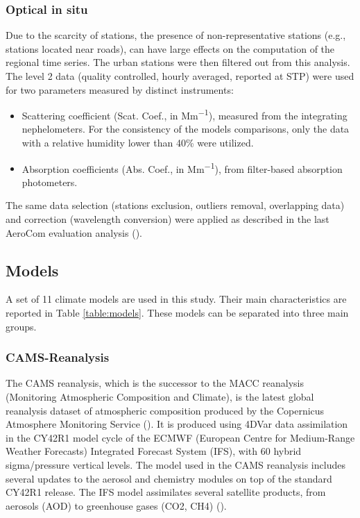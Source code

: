 \documentclass[journal abbreviation, manuscript]{copernicus}
\begin{document}
\subsubsection{Optical in situ}
Due to the scarcity of stations, the presence of non-representative stations (e.g., stations located near roads), can have large effects on the computation of the regional time series. The urban stations were then filtered out from this analysis. The level 2 data (quality controlled, hourly averaged, reported at STP) were used for two parameters measured by distinct instruments:

\begin{itemize}
 \item Scattering coefficient (Scat. Coef., in \unit{Mm^{-1}}), measured from the integrating nephelometers. For the consistency of the models comparisons, only the data with a relative humidity lower than 40\% were utilized.
 \item Absorption coefficients (Abs. Coef., in \unit{Mm^{-1}}), from filter-based absorption photometers.
\end{itemize}

The same data selection (stations exclusion, outliers removal, overlapping data) and correction (wavelength conversion) were applied as described in the last AeroCom evaluation analysis (\cite{jonaseval}).

\subsection{Models}
A set of 11 climate models are used in this study. Their main characteristics are reported in Table \ref{table:models}. These models can be separated into three main groups.

\subsubsection{CAMS-Reanalysis}
The CAMS reanalysis, which is the successor to the MACC reanalysis (Monitoring Atmospheric Composition and Climate), is the latest global reanalysis dataset of atmospheric composition produced by the Copernicus Atmosphere Monitoring Service (\cite{inness2019cams}). It is produced using 4DVar data assimilation in the CY42R1 model cycle of the ECMWF (European Centre for Medium-Range Weather Forecasts) Integrated Forecast System (IFS), with 60 hybrid sigma/pressure vertical levels. The model used in the CAMS reanalysis includes several updates to the aerosol and chemistry modules on top of the standard CY42R1 release. The IFS model assimilates several satellite products, from aerosols (AOD) to greenhouse gases (CO2, CH4) (\cite{inness2019cams}).
\end{document}

